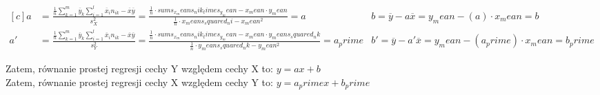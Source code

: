 \documentclass{article}
\begin{document}
\begin{adjustwidth}{-40pt}{0pt}
\begin{equation*}
\begin{aligned}[c]
    a &= \frac{\frac{1}{n}\sum\limits_{k=1}^m \overline{y}_k \sum\limits_{i=1}^l\overline{x}_in_{ik} - \overline{x}\overline{y}}{s^2_X} =
    \frac{\frac{1}{ {{ n }} } \cdot {{ sums_x_means_nik_times_y_mean }} - {{ x_mean }} \cdot {{ y_mean }} }{\frac{1}{ {{ n }} } \cdot {{ x_means_squared_ni }}  - {{ x_mean }}^2} = {{ a }}
    & b  = \overline{y} - a\overline{x} = {{ y_mean }} - ({{ a }}) \cdot {{ x_mean }} = {{ b }} & \\
    a' &= \frac{\frac{1}{n}\sum\limits_{k=1}^m \overline{y}_k \sum\limits_{i=1}^l\overline{x}_in_{ik} - \overline{x}\overline{y}}{s^2_Y} =
    \frac{\frac{1}{ {{ n }} } \cdot {{ sums_x_means_nik_times_y_mean }} - {{ x_mean }} \cdot {{ y_means_squared_nk }}}{\frac{1}{ {{ n }} } \cdot {{ y_means_squared_nk }} - {{ y_mean }}^2} = {{ a_prime }}
    & b' = \overline{y} - a'\overline{x} = {{ y_mean }} - ({{ a_prime }})\cdot {{ x_mean }} = {{ b_prime }}
\end{aligned}
\end{equation*}
\end{adjustwidth}

\begin{adjustwidth}{-40pt}{0pt}
Zatem, równanie prostej regresji cechy Y względem cechy X to: $y = {{ a }}x + {{ b }}$ \\
Zatem, równanie prostej regresji cechy X względem cechy Y to: $y = {{ a_prime }}x + {{ b_prime }}$
\end{adjustwidth}
\end{document}
